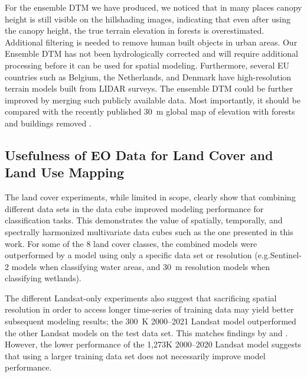 For the ensemble DTM we have produced, we noticed that in many places canopy height is still visible on the hillshading images, indicating that even after using the canopy height, the true terrain elevation in forests is overestimated. Additional filtering is needed to remove human built objects in urban areas. Our Ensemble DTM has not been hydrologically corrected and will require additional processing before it can be used for spatial modeling. Furthermore, several EU countries such as Belgium, the Netherlands, and Denmark have high-resolution terrain models built from LIDAR surveys. The 
ensemble DTM could be further improved by merging such publicly available data.  Most importantly, it should be compared with the recently published 30~m global map of elevation with forests and buildings removed \citep{hawker202230}.

\subsection*{Usefulness of EO Data for Land Cover and Land Use Mapping}

The land cover experiments, while limited in scope, clearly show that combining different data sets in the data cube improved modeling performance for classification tasks. This demonstrates the value of spatially, temporally, and spectrally harmonized multivariate data cubes such as the one presented in this work. For some of the 8 land cover classes, the combined models were outperformed by a model using only a specific data set or resolution (e.g.\@ Sentinel-2 models when classifying water areas, and 30~m resolution models when classifying wetlands).  

The different Landsat-only experiments also suggest that sacrificing spatial resolution in order to access longer time-series of training data may yield better subsequent modeling results; the 300~K 2000--2021 Landsat model outperformed the other Landsat models on the test data set. This matches findings by \citet{witjes2022spatiotemporal} and \citet{pflugmacher2019mapping}. However, the lower performance of the 1,273K 2000--2020 Landsat model suggests that using a larger training data set does not necessarily improve model performance.

